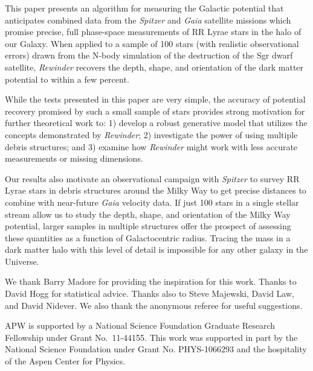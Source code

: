 \documentclass{emulateapj}
\begin{document}
This paper presents an algorithm for measuring the Galactic potential
that anticipates combined data from the {\it Spitzer} and {\it Gaia} satellite
missions which promise precise, full phase-space measurements of RR
Lyrae stars in the halo of our Galaxy. When applied to a sample of 100
stars (with realistic observational errors) drawn from the
\cite{law10} N-body simulation of the destruction of the Sgr dwarf
satellite, \emph{Rewinder} recovers the depth, shape, and orientation of the dark
matter potential to within a few percent.

While the tests presented in this paper are very simple, the accuracy of potential recovery promised by such a small sample of stars 
provides strong motivation for further theoretical work to: 1) develop a robust generative model that utilizes the concepts demonstrated by \emph{Rewinder}; 2) investigate the power of using multiple debris structures; and 3) examine how \emph{Rewinder} might work with less accurate measurements or missing dimensions. 

Our results also motivate an observational campaign with {\it Spitzer} to survey RR Lyrae stars in debris structures around the Milky Way to get precise distances to combine with near-future {\it Gaia} velocity data. 
If just 100 stars in a single stellar stream allow us to study the depth, shape, and orientation of the Milky Way potential, larger samples in multiple structures \citep[e.g., the Orphan Stream;][]{sesar13} offer the prospect of assessing these quantities as a function of Galactocentric radius. Tracing the mass in a dark matter halo with this level of detail is impossible for any other galaxy in the Universe.

\acknowledgments
We thank Barry Madore for providing the inspiration for this work. Thanks to 
David Hogg for statistical advice. Thanks also to Steve Majewski, David 
Law, and David Nidever. We also thank the anonymous referee for useful 
suggestions. 

APW is supported by a National Science Foundation Graduate Research
Fellowship under Grant No.\ 11-44155. This work was supported in part by 
the National Science Foundation under Grant No. PHYS-1066293 and the 
hospitality of the Aspen Center for Physics.


%
\end{document}
